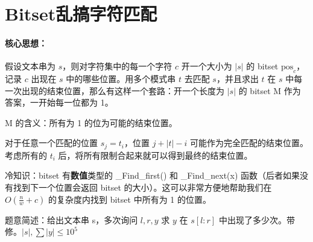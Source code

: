 \section{Bitset乱搞字符匹配}
\paragraph{核心思想：}假设文本串为 $s$，则对字符集中的每一个字符 $c$ 开一个大小为 $|s|$ 的 bitset $\text{pos}_c$，记录 $c$ 出现在 $s$ 中的哪些位置。用多个模式串 $t$ 去匹配 $s$，并且求出 $t$ 在 $s$ 中每一次出现的结束位置，那么有这样一个套路：开一个长度为 $|s|$ 的 bitset M 作为答案，一开始每一位都为 1。


\par \noindent M 的含义：所有为 1 的位为可能的结束位置。​
~\\
\par \noindent 对于任意一个匹配的位置 $s_j=t_i$，位置 $j+|t|-i$ 可能作为完全匹配的结束位置。考虑所有的 $t_i$ 后，将所有限制合起来就可以得到最终的结束位置。
~\\
\par \noindent 冷知识：bitset 有\textbf{数值}类型的 \_Find\_first() 和 \_Find\_next(x) 函数（后者如果没有找到下一个位置会返回 bitset 的大小）。这可以非常方便地帮助我们在 $O(\frac n w+c)$ 的复杂度内找到 bitset 中所有为 1 的位置。
~\\
\begin{tcolorbox}
\par \noindent 题意简述：给出文本串 s，多次询问 $l,r,y$ 求 $y$ 在 $s[l:r]$ 中出现了多少次。带修。$|s|,\sum |y|≤10^5$
\end{tcolorbox}

